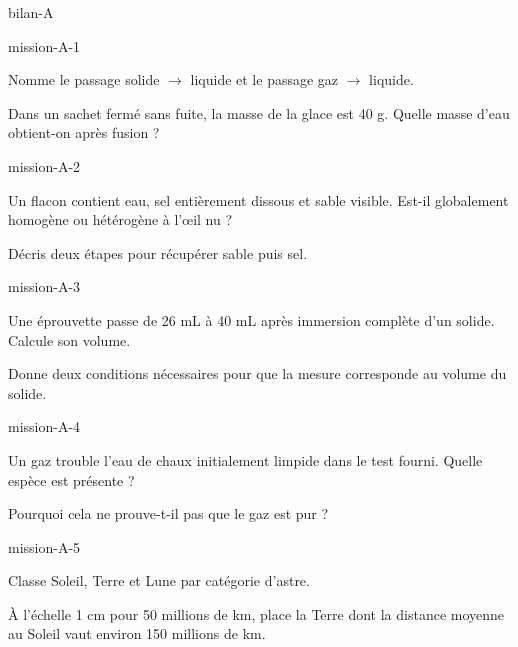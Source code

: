 \documentclass[12pt,twoside,openany]{book}
\begin{document}
\begin{pcFiche}{bilan-A}
\begin{blocLivre}{mission-A-1}
\begin{questions}
\item Nomme le passage solide \(\rightarrow\) liquide et le passage gaz \(\rightarrow\) liquide.
\item Dans un sachet fermé sans fuite, la masse de la glace est 40 g. Quelle masse d’eau obtient-on après fusion ?
\end{questions}
\end{blocLivre}
\begin{blocLivre}{mission-A-2}
\begin{questions}
\item Un flacon contient eau, sel entièrement dissous et sable visible. Est-il globalement homogène ou hétérogène à l’œil nu ?
\item Décris deux étapes pour récupérer sable puis sel.
\end{questions}
\end{blocLivre}
\begin{blocLivre}{mission-A-3}
\begin{questions}
\item Une éprouvette passe de 26 mL à 40 mL après immersion complète d’un solide. Calcule son volume.
\item Donne deux conditions nécessaires pour que la mesure corresponde au volume du solide.
\end{questions}
\end{blocLivre}
\begin{blocLivre}{mission-A-4}
\begin{questions}
\item Un gaz trouble l’eau de chaux initialement limpide dans le test fourni. Quelle espèce est présente ?
\item Pourquoi cela ne prouve-t-il pas que le gaz est pur ?
\end{questions}
\end{blocLivre}
\begin{blocLivre}{mission-A-5}
\begin{questions}
\item Classe Soleil, Terre et Lune par catégorie d’astre.
\item À l’échelle 1 cm pour 50 millions de km, place la Terre dont la distance moyenne au Soleil vaut environ 150 millions de km.
\end{questions}
\end{blocLivre}
\end{pcFiche}
\end{document}
